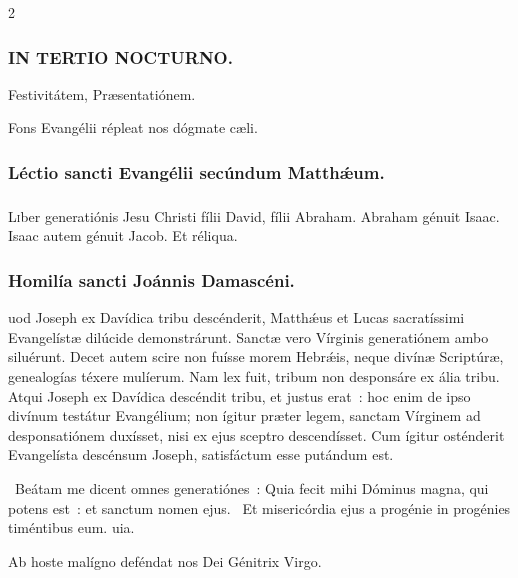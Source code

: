 \documentclass[9pt,twoside]{extarticle}
\begin{document}
\begin{multicols}{2}
\subsubsection*{\center \textsc{IN TERTIO NOCTURNO.}}
\begin{tightlist}{}
\item {} Festivitátem,  Præsentatiónem.
\item {\small {} Fons Evangélii répleat nos dógmate cæli.}
\end{tightlist}

\subsubsection*{\center Léctio sancti Evangélii secúndum Matthǽum.}
\subsubsection*{\center {} \hfill {}}
\lettrine{L}iber generatiónis Jesu Christi fílii David, fílii Abraham. Abraham génuit Isaac. Isaac autem génuit Jacob. Et réliqua. 

\subsubsection*{\center \normalfont Homilía sancti Joánnis Damascéni.\\
}

uod Joseph ex Davídica tribu descénderit, Matthǽus et Lucas sacratíssimi Evangelístæ dilúcide demonstrárunt. Sanctæ vero Vírginis generatiónem ambo siluérunt. Decet autem scire non fuísse morem Hebrǽis, neque divínæ Scriptúræ, genealogías téxere mulíerum. Nam lex fuit, tribum non desponsáre ex ália tribu. Atqui Joseph ex Davídica descéndit tribu, et justus erat~: hoc enim de ipso divínum testátur Evangélium; non ígitur præter legem, sanctam Vírginem ad desponsatiónem duxísset, nisi ex ejus sceptro descendísset. Cum ígitur osténderit Evangelísta descénsum Joseph, satisfáctum esse putándum est.

\begin{tightlist}{}
\item {}~Beátam me dicent omnes generatiónes~: \textred{*} Quia fecit mihi Dóminus magna, qui potens est~: et sanctum nomen ejus. ~Et misericórdia ejus a progénie in progénies timéntibus eum. uia.
\item {\small {} Ab hoste malígno deféndat nos Dei Génitrix Virgo.}
\end{tightlist}


\end{multicols}
\end{document}
